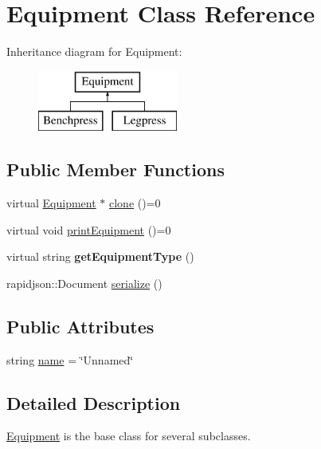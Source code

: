 \hypertarget{class_equipment}{}\section{Equipment Class Reference}
\label{class_equipment}
Inheritance diagram for Equipment\+:\begin{figure}[H]
\begin{center}
\leavevmode
\includegraphics[height=2.000000cm]{class_equipment}
\end{center}
\end{figure}
\subsection*{Public Member Functions}
\begin{DoxyCompactItemize}
\item 
virtual \hyperlink{class_equipment}{Equipment} $\ast$ \hyperlink{class_equipment_a866383329b92e50a2c323e05e55fa948}{clone} ()=0
\item 
virtual void \hyperlink{class_equipment_a12b5c474bf74a6f2272f02d0a745b41d}{print\+Equipment} ()=0
\item 
\hypertarget{class_equipment_a719429595638879fd91d7205097ab118}{}virtual string {\bfseries get\+Equipment\+Type} ()\label{class_equipment_a719429595638879fd91d7205097ab118}

\item 
rapidjson\+::\+Document \hyperlink{class_equipment_aa398c2e8e7b46534b8284788c30cf45e}{serialize} ()
\end{DoxyCompactItemize}
\subsection*{Public Attributes}
\begin{DoxyCompactItemize}
\item 
string \hyperlink{class_equipment_a65c3c95bb543fd763fe6bdf7587c1d33}{name} = \char`\"{}Unnamed\char`\"{}
\end{DoxyCompactItemize}


\subsection{Detailed Description}
\hyperlink{class_equipment}{Equipment} is the base class for several subclasses. 

